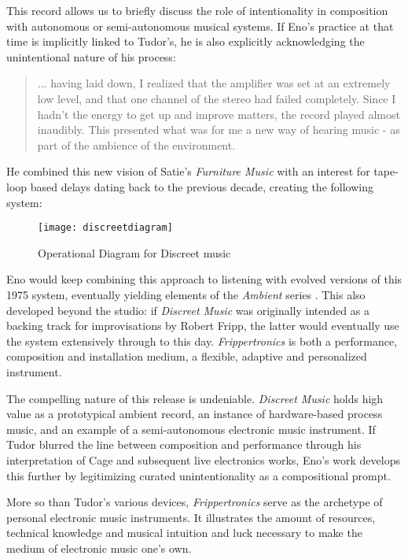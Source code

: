 \begin{itemize}
This record allows us to briefly discuss the role of intentionality in composition with autonomous or semi-autonomous musical systems. If Eno's practice at that time is implicitly linked to Tudor's, he is also explicitly acknowledging the unintentional nature of his process: 

\begin{quote} ... having laid down, I realized that the amplifier was set at an extremely low level, and that one channel of the stereo had failed completely. Since I hadn't the energy to get up and improve matters, the record played almost inaudibly. This presented what was for me a new way of hearing music - as part of the ambience of the environment.
	
	\cite{eno1975}
	\end{quote}

He combined this new vision of Satie's \emph{Furniture Music} \cite{satie} with an interest for tape-loop based delays dating back to the previous decade, creating the following system: 

\begin{figure}[h!]
  \caption{Operational Diagram for Discreet music}
  \centering
    \texttt{[image: discreetdiagram]}
\end{figure}

Eno would keep combining this approach to listening with evolved versions of this 1975 system, eventually yielding elements of the \emph{Ambient} series \cite{eno1978,eno1980,eno1980b,eno1982}. This also developed beyond the studio: if \emph{Discreet Music} was originally intended as a backing track for improvisations by Robert Fripp, the latter would eventually use the system extensively through to this day. \emph{Frippertronics} is both a performance, composition and installation medium, a flexible, adaptive and personalized instrument.  

The compelling nature of this release is undeniable. \emph{Discreet Music } holds high value as a prototypical ambient record, an instance of hardware-based process music, and an example of a semi-autonomous electronic music instrument. If Tudor blurred the line between composition and performance through his interpretation of Cage and subsequent live electronics works, Eno's work develops this further by legitimizing curated unintentionality as a compositional prompt. 

More so than Tudor's various devices, \emph{Frippertronics} serve as the archetype of personal electronic music instruments. It illustrates the amount of resources, technical knowledge and musical intuition and luck necessary to make the medium of electronic music one's own. 


\end{itemize}
